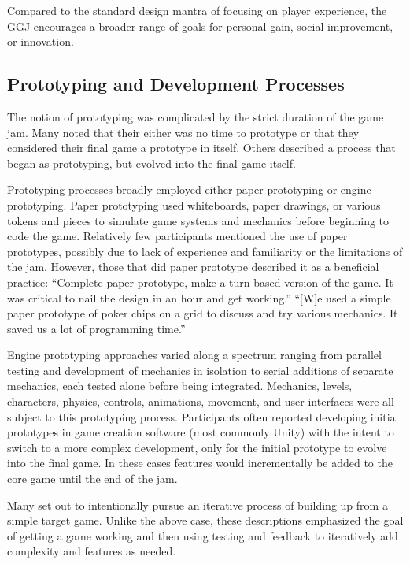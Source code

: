 \documentclass{sig-alternate}
\begin{document}
Compared to the standard design mantra of focusing on player experience, the GGJ encourages a broader range of goals for personal gain, social improvement, or innovation. 


\subsection{Prototyping and Development Processes}
The notion of prototyping was complicated by the strict duration of the game jam. Many noted that their either was no time to prototype or that they considered their final game a prototype in itself. Others described a process that began as prototyping, but evolved into the final game itself.

Prototyping processes broadly employed either paper prototyping or engine prototyping. Paper prototyping used whiteboards, paper drawings, or various tokens and pieces to simulate game systems and mechanics before beginning to code the game. Relatively few participants mentioned the use of paper prototypes, possibly due to lack of experience and familiarity or the limitations of the jam. However, those that did paper prototype described it as a beneficial practice:
``Complete paper prototype, make a turn-based version of the game. It was critical to nail the design in an hour and get working.''
``[W]e used a simple paper prototype of poker chips on a grid to discuss and try various mechanics. It saved us a lot of programming time.''

Engine prototyping approaches varied along a spectrum ranging from parallel testing and development of mechanics in isolation to serial additions of separate mechanics, each tested alone before being integrated. Mechanics, levels, characters, physics, controls, animations, movement, and user interfaces were all subject to this prototyping process. 
Participants often reported developing initial prototypes in game creation software (most commonly Unity) with the intent to switch to a more complex development, only for the initial prototype to evolve into the final game. In these cases features would incrementally be added to the core game until the end of the jam.

Many set out to intentionally pursue an iterative process of building up from a simple target game. Unlike the above case, these descriptions emphasized the goal of getting a game working and then using testing and feedback to iteratively add complexity and features as needed.
\end{document}

